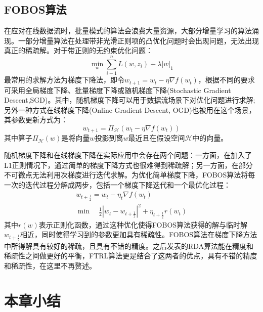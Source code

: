 \subsection{FOBOS算法}
在应对在线数据流时，批量模式的算法会浪费大量资源，大部分增量学习的算法涌现。一部分增量算法在处理带非光滑正则项的凸优化问题时会出现问题，无法出现真正的稀疏解。对于带正则的无约束优化问题：
\begin{equation}
	\min_w \sum_{i-1}^{n}L(w,z_i) +\lambda|w|_1
\end{equation}
最常用的求解方法为梯度下降法，即令$w_{t+1} = w_t - \eta 
\nabla f(w_t)$，根据不同的要求可采用全局梯度下降、批量梯度下降或随机梯度下降(Stochastic Gradient Descent,SGD)。其中，随机梯度下降可以用于数据流场景下对优化问题进行求解;另外一种方式在线梯度下降(Online Gradient Descent, OGD)\cite{zinkevich2003online}也被用在这个场景，其参数更新方式为：
\begin{equation}
	w_{t+1} = \Pi_{\mathcal{H}}(w_t - \eta 
	\nabla f(w_t))
\end{equation}
其中算子$\Pi_{\mathcal{H}}(w)$是将向量$w$投影到离$w$最近且在假设空间$\mathcal{H}$中的向量。

随机梯度下降和在线梯度下降在实际应用中会存在两个问题：一方面，在加入了L1正则情况下，通过简单的梯度下降方式也很难得到稀疏解；另一方面，在部分不可微点无法利用次梯度进行迭代求解。为优化简单梯度下降，FOBOS算法将每一次的迭代过程分解成两步，包括一个梯度下降迭代和一个最优化过程：
\begin{equation}
\begin{aligned}
w_{t+\frac{1}{2}} = w_t -\eta_t 
\nabla f(w_t) \\
\min \quad \frac{1}{2}|w_t-w_{t+\frac{1}{2}}|^2 + \eta_{t+\frac{1}{2}}r(w_t)
\end{aligned}
\end{equation}
其中$r(w)$表示正则化函数，通过这种优化使得FOBOS算法获得的解与临时解$w_{t+\frac{1}{2}}$相近，同时使得学习到的参数更加具有稀疏性。FOBOS算法在梯度下降方法中所得解具有较好的稀疏，且具有不错的精度。之后发表的RDA算法能在精度和稀疏性之间做更好的平衡，FTRL算法更是结合了这两者的优点，具有不错的精度和稀疏性，在这里不再赘述。





\section{本章小结}





	